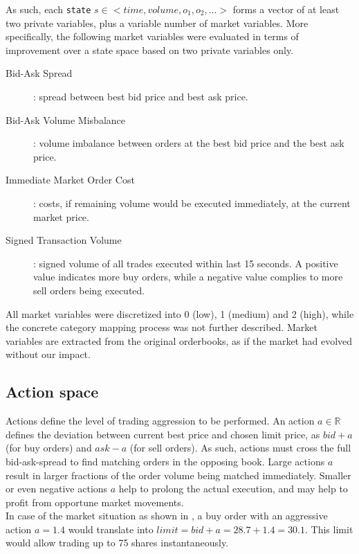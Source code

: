 As such, each \lstinline!state! $s \in <time, volume ,o_1, o_2, ...>$ forms a vector of at least two private variables, plus a variable number of market variables. More specifically, the following market variables were evaluated in terms of improvement over a state space based on two private variables only.
\begin{description}
\item[Bid-Ask Spread]: spread between best bid price and best ask price.
\item[Bid-Ask Volume Misbalance]: volume imbalance between orders at the best bid price and the best ask price.
\item[Immediate Market Order Cost]: costs, if remaining volume would be executed immediately, at the current market price.
\item[Signed Transaction Volume]: signed volume of all trades executed within last 15 seconds. A positive value indicates more buy orders, while a negative value complies to more sell orders being executed.
\end{description}

All market variables were discretized into 0 (low), 1 (medium) and 2 (high), while the concrete category mapping process was not further described. Market variables are extracted from the original orderbooks, as if the market had evolved without our impact.

\subsection{Action space}
\label{chap:actionspace}
Actions define the level of trading aggression to be performed. An action $a \in \mathbb{R}$ defines the deviation between current best price and chosen limit price, as $bid + a$ (for buy orders) and $ask - a$ (for sell orders). As such, actions must cross the full bid-ask-spread to find matching orders in the opposing book. Large actions $a$ result in larger fractions of the order volume being matched immediately. Smaller or even negative actions $a$ help to prolong the actual execution, and may help to profit from opportune market movements.\\

In case of the market situation as shown in , a buy order with an aggressive action $a=1.4$ would translate into $limit=bid+a=28.7+1.4=30.1$. This limit would allow trading up to 75 shares instantaneously.\\

